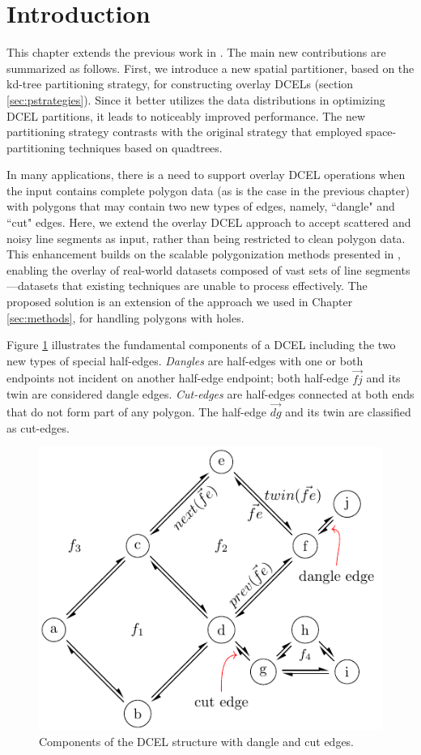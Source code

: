 \section{Introduction} %

This chapter extends the previous work in \cite{calderon_scalable_2023}. The main new contributions are summarized as follows. First, we introduce a new spatial partitioner, based on the kd-tree partitioning strategy, for constructing overlay  DCELs (section \ref{sec:pstrategies}). Since it better utilizes the data distributions in optimizing DCEL partitions, it leads to noticeably improved performance. The new partitioning strategy contrasts with the original strategy that employed space-partitioning techniques based on quadtrees. 

In many applications, there is a need to support overlay DCEL operations when the input contains complete polygon data (as is the case in the previous chapter) with polygons that may contain two new types of edges, namely, ``dangle" and ``cut" edges. Here, we extend the overlay DCEL approach to accept scattered and noisy line segments as input, rather than being restricted to clean polygon data. This enhancement builds on the scalable polygonization methods presented in \cite{abdelhafeez_ddcel_2023}, enabling the overlay of real-world datasets composed of vast sets of line segments —datasets that existing techniques are unable to process effectively. The proposed solution is an extension of the approach we used in Chapter \ref{sec:methods}, for handling polygons with holes.


Figure \ref{fig:extension_dcel_example} illustrates the fundamental components of a DCEL including the two new types of special half-edges. \textit{Dangles} are half-edges with one or both endpoints not incident on another half-edge endpoint; both half-edge $\overrightarrow{fj}$ and its twin are considered dangle edges. \textit{Cut-edges} are half-edges connected at both ends that do not form part of any polygon. The half-edge $\overrightarrow{dg}$ and its twin are classified as cut-edges.

\begin{figure}
    \centering
    \includegraphics[width=0.6\linewidth]{chapterExtension/dcel_example2}
    \caption{Components of the DCEL structure with dangle and cut edges.}\label{fig:extension_dcel_example}
\end{figure}


